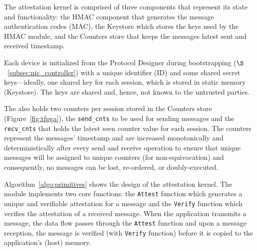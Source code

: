   The attestation kernel is comprised of three components that represent its state and functionality: the HMAC component that generates the message authentication codes (MAC), the Keystore which stores the keys used by the HMAC module, and the Counters store that keeps the messages latest sent and received timestamp. 

Each \projecttitle{} device is initialized from the Protocol Designer during bootstrapping ($\S$~\ref{subsec:nic_controller}) with a unique identifier (ID) and some shared secret keys---ideally, one shared key for each session, which is stored in static memory (Keystore). The keys are shared and, hence, not known to the untrusted parties. %

The \projecttitle{} also holds two counters per session stored in the Counters store (Figure~\ref{fig:tfpga}), the {\tt send\_cnts} to be used for sending messages and the \texttt{recv\_cnts} that holds the latest seen counter value for each session. The counters represent the messages' timestamp and are increased monotonically and deterministically after every send and receive operation to ensure that unique messages will be assigned to unique counters (for non-equivocation) and consequently, no messages can be lost, re-ordered, or doubly-executed.




   Algorithm~\ref{algo:primitives} shows the design of the attestation kernel. The module implements two core functions: the {\tt Attest} function which generates a unique and verifiable attestation for a message and the {\tt Verify} function which verifies the attestation of a received message. When the application transmits a message, the data flow passes through the {\tt Attest} function and upon a message reception, the message is verified (with {\tt Verify} function) before it is copied to the application's (host) memory. 

